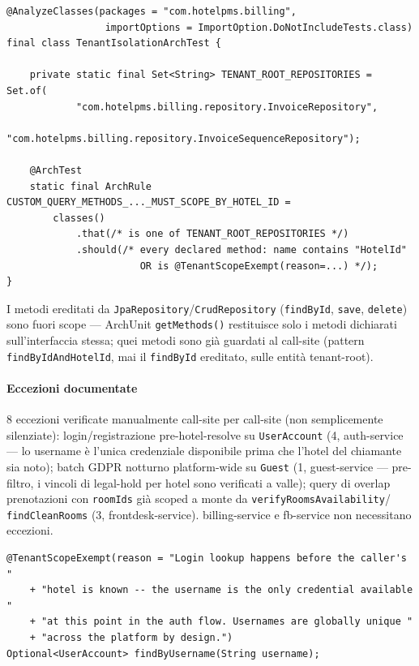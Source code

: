 ﻿\documentclass[a4paper,12pt]{report}
\begin{document}
\begin{securebox}[title={TenantIsolationArchTest.java --- struttura della regola}]
\begin{lstlisting}[style=java]
@AnalyzeClasses(packages = "com.hotelpms.billing",
                 importOptions = ImportOption.DoNotIncludeTests.class)
final class TenantIsolationArchTest {

    private static final Set<String> TENANT_ROOT_REPOSITORIES = Set.of(
            "com.hotelpms.billing.repository.InvoiceRepository",
            "com.hotelpms.billing.repository.InvoiceSequenceRepository");

    @ArchTest
    static final ArchRule CUSTOM_QUERY_METHODS_..._MUST_SCOPE_BY_HOTEL_ID =
        classes()
            .that(/* is one of TENANT_ROOT_REPOSITORIES */)
            .should(/* every declared method: name contains "HotelId"
                       OR is @TenantScopeExempt(reason=...) */);
}
\end{lstlisting}
\end{securebox}

I metodi ereditati da \texttt{JpaRepository}/\texttt{CrudRepository}
(\texttt{findById}, \texttt{save}, \texttt{delete}) sono fuori scope --- ArchUnit
\texttt{getMethods()} restituisce solo i metodi dichiarati sull'interfaccia
stessa; quei metodi sono già guardati al call-site (pattern
\texttt{findByIdAndHotelId}, mai il \texttt{findById} ereditato, sulle entità
tenant-root).

\paragraph{Eccezioni documentate}
8 eccezioni verificate manualmente call-site per call-site (non semplicemente
silenziate): login/registrazione pre-hotel-resolve su \texttt{UserAccount}
(4, auth-service --- lo username è l'unica credenziale disponibile prima che
l'hotel del chiamante sia noto); batch GDPR notturno platform-wide su
\texttt{Guest} (1, guest-service --- pre-filtro, i vincoli di legal-hold per
hotel sono verificati a valle); query di overlap prenotazioni con
\texttt{roomIds} già scoped a monte da \texttt{verifyRoomsAvailability}/
\texttt{findCleanRooms} (3, frontdesk-service). billing-service e fb-service
non necessitano eccezioni.

\begin{insecurebox}[title={Esempio di eccezione documentata}]
\begin{lstlisting}[style=java]
@TenantScopeExempt(reason = "Login lookup happens before the caller's "
    + "hotel is known -- the username is the only credential available "
    + "at this point in the auth flow. Usernames are globally unique "
    + "across the platform by design.")
Optional<UserAccount> findByUsername(String username);
\end{lstlisting}
\end{insecurebox}
\end{document}
